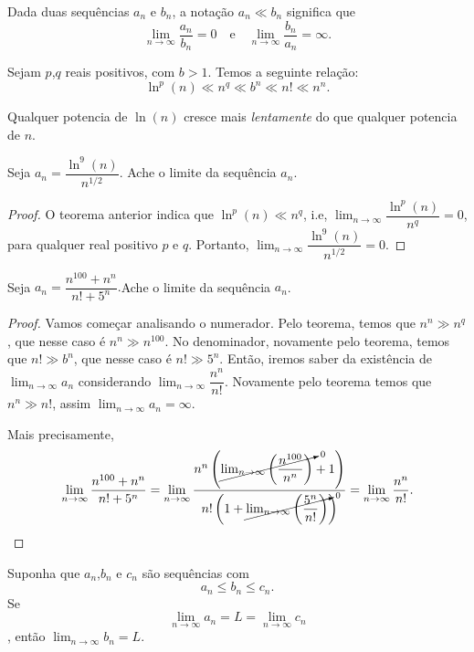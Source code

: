      \begin{definition}
         Dada duas sequências ${a_{n}}$ e ${b_{n}}$, a notação 
         $a_{n} \ll b_{n}$ significa que
         $$\lim_{n\to\infty}\dfrac{a_{n}}{b_{n}} = 
         0\quad\textrm{e}\quad \lim_{n\to\infty}
         \dfrac{b_{n}}{a_{n}} = \infty.$$
      \end{definition}
      \begin{theorem}
         Sejam $p$,$q$ reais positivos, com $b>1$. Temos a 
         seguinte relação:
         $$\ln^{p}(n) \ll n^{q} \ll b^{n} \ll n! \ll n^{n}.$$
      \end{theorem}
      Qualquer potencia de $\ln(n)$ cresce mais \emph{lentamente} 
      do que qualquer potencia de $n$.
      \begin{exmp}
         Seja $a_{n} = \dfrac{\ln^{9}(n)}{n^{1/2}}$. Ache o 
         limite da sequência $a_{n}$.
         \begin{proof}
            O teorema anterior indica que $\ln^{p}(n) \ll n^{q}$, i.e,
            $\lim_{n\to\infty}\dfrac{\ln^{p}(n)}{n^{q}} = 0$, 
            para qualquer real positivo $p$ e $q$. Portanto, 
            $\lim_{n\to\infty}\dfrac{\ln^{9}(n)}{n^{1/2}} = 0.$
         \end{proof}
      \end{exmp}
      \begin{exmp}
         Seja $a_{n} = \dfrac{n^{100}+n^{n}}{n!+5^{n}}.$Ache o 
         limite da sequência $a_{n}$.
         \begin{proof}
            Vamos começar analisando o numerador. Pelo teorema, 
            temos que $n^{n} \gg n^{q}$, que nesse caso é 
            $n^{n} \gg n^{100}$. No denominador, novamente pelo teorema, 
            temos que $n! \gg b^{n}$, que nesse caso é $n! \gg 5^{n}$. 
            Então, iremos saber da existência de $\lim_{n\to\infty}a_{n}$ 
            considerando $\lim_{n\to\infty} \dfrac{n^{n}}{n!}.$
            Novamente pelo teorema temos que $n^{n} \gg n!$, assim 
            $\lim_{n\to\infty} a_{n} = \infty.$
            
            Mais precisamente, 
            $$\lim_{n\to\infty}\dfrac{n^{100}+n^{n}}{n!+5^{n}} = 
            \lim_{n\to\infty}\dfrac{n^{n}\left(
            \cancelto{0}{\lim_{n\to\infty}
            \left(\dfrac{n^{100}}{n^{n}}\right)}
            +1\right)}{n!\left(1+\cancelto{0}{\lim_{n\to\infty}
            \left(\dfrac{5^{n}}{n!}\right)}\right)} = 
            \lim_{n\to\infty} \dfrac{n^{n}}{n!}.$$
         \end{proof}
      \end{exmp}
      \begin{theorem}
         Suponha que $a_{n}$,$b_{n}$ e $c_{n}$ são sequências com 
         $$a_{n} \leq b_{n} \leq c_{n}.$$ 
         Se $$\lim_{n\to\infty}a_{n} = L = \lim_{n\to\infty}c_{n}$$, 
         então $\lim_{n\to\infty}b_{n} = L.$
      \end{theorem}
